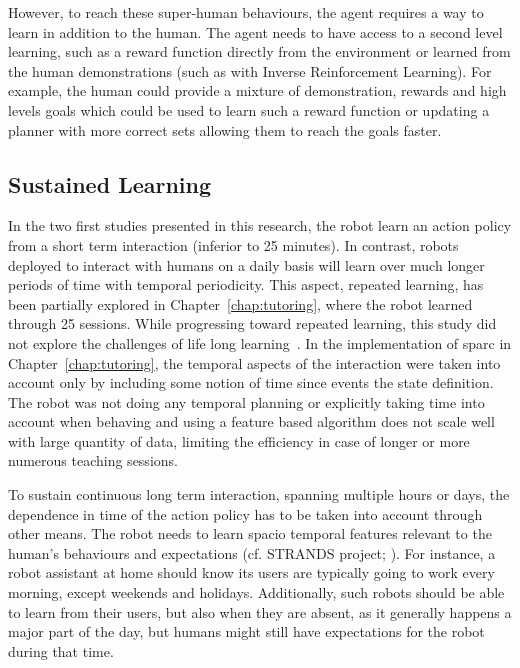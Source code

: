 However, to reach these super-human behaviours, the agent requires a way to learn in addition to the human. The agent needs to have access to a second level learning, such as a reward function directly from the environment or learned from the human demonstrations (such as with Inverse Reinforcement Learning). For example, the human could provide a mixture of demonstration, rewards and high levels goals which could be used to learn such a reward function or updating a planner with more correct sets allowing them to reach the goals faster.

\subsection{Sustained Learning}


In the two first studies presented in this research, the robot learn an action policy from a short term interaction (inferior to 25 minutes). In contrast, robots deployed to interact with humans on a daily basis will learn over much longer periods of time with temporal periodicity. This aspect, repeated learning, has been partially explored in Chapter~\ref{chap:tutoring}, where the robot learned through 25 sessions. While progressing toward repeated learning, this study did not explore the challenges of life long learning~\citep{thrun1995lifelong}. In the implementation of \gls{sparc} in Chapter~\ref{chap:tutoring}, the temporal aspects of the interaction were taken into account only by including some notion of time since events the state definition. The robot was not doing any temporal planning or explicitly taking time into account when behaving and using a feature based algorithm does not scale well with large quantity of data, limiting the efficiency in case of longer or more numerous teaching sessions. 

To sustain continuous long term interaction, spanning multiple hours or days, the dependence in time of the action policy has to be taken into account through other means. The robot needs to learn spacio temporal features relevant to the human's behaviours and expectations (cf. STRANDS project; \citealt{hawes2017strands}). For instance, a robot assistant at home should know its users are typically going to work every morning, except weekends and holidays. Additionally, such robots should be able to learn from their users, but also when they are absent, as it generally happens a major part of the day, but humans might still have expectations for the robot during that time.

